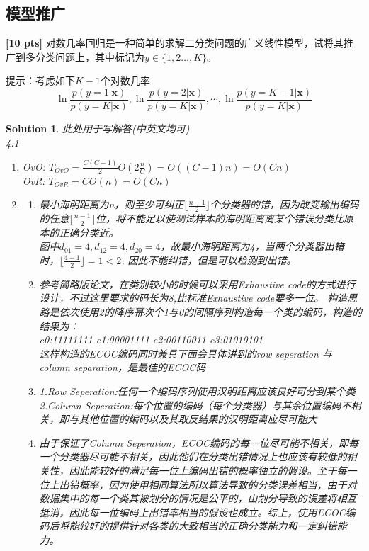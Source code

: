 \documentclass[a4paper,UTF8]{article}
\numberwithin{equation}{section}
\newtheorem*{solution}{Solution}
\begin{document}
\subsection{模型推广}
\textbf{[10 pts]} 对数几率回归是一种简单的求解二分类问题的广义线性模型，试将其推广到多分类问题上，其中标记为$y\in\{1,2\dots,K\}$。

提示：考虑如下$K-1$个对数几率
$$\ln\frac{p(y=1|\mathbf{x})}{p(y=K|\mathbf{x})},	\ln\frac{p(y=2|\mathbf{x})}{p(y=K|\mathbf{x})},\cdots,	\ln\frac{p(y=K-1|\mathbf{x})}{p(y=K|\mathbf{x})}$$

\begin{solution} 此处用于写解答(中英文均可)\\
	4.1
	\begin{enumerate}[(1)]
		\item	OvO: $T_{OvO} = \frac{C(C-1)}{2} O(2\frac{n}{C}) = O((C-1)n)=O(Cn)$\\
				OvR: $T_{OvR} = C O(n) = O(Cn)$
		\item  
		\begin{enumerate}[1)]
			\item 最小海明距离为n，则至少可纠正$\lfloor \frac{n-1}{2} \rfloor$个分类器的错，因为改变输出编码的任意$\lfloor \frac{n-1}{2} \rfloor$位，将不能足以使测试样本的海明距离离某个错误分类比原本的正确分类近。\\
				  图中$d_{01}=4,d_{12}=4,d_{20}=4$，故最小海明距离为4，当两个分类器出错时，$\lfloor \frac{4-1}{2} \rfloor = 1 < 2$, 因此不能纠错，但是可以检测到出错。
			\item 参考简略版论文，在类别较小的时候可以采用Exhaustive code的方式进行设计，不过这里要求的码长为8,比标准Exhaustive code要多一位。
				  构造思路是依次使用2的降序幂次个1与0的间隔序列构造每一个类的编码，构造的结果为：\\ c0:11111111 c1:00001111 c2:00110011 c3:01010101\\
				  这样构造的ECOC编码同时兼具下面会具体讲到的row seperation 与 column separation，是最佳的ECOC码
			\item 1.Row Seperation:任何一个编码序列使用汉明距离应该良好可分到某个类
				  \\2.Column Seperation:每个位置的编码（每个分类器）与其余位置编码不相关，即与其他位置的编码以及其取反结果的汉明距离应尽可能大
			\item 由于保证了Column Seperation，ECOC编码的每一位尽可能不相关，即每一个分类器尽可能不相关，因此他们在分类出错情况上也应该有较低的相关性，因此能较好的满足每一位上编码出错的概率独立的假设。至于每一位上出错概率，因为使用相同算法所以算法导致的分类误差相当，由于对数据集中的每一个类其被划分的情况是公平的，由划分导致的误差将相互抵消，因此每一位编码上出错率相当的假设也成立。综上，使用ECOC编码后将能较好的提供针对各类的大致相当的正确分类能力和一定纠错能力。

\end{enumerate}
\end{enumerate}
\end{solution}
\end{document}
